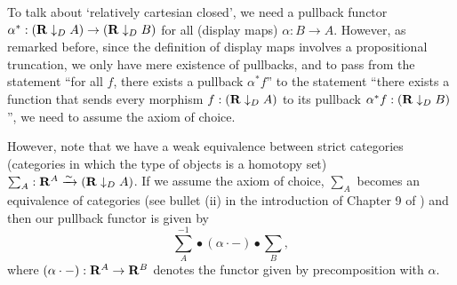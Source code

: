 \begin{remark}
  To talk about `relatively cartesian closed', we need a pullback functor $ \alpha^* : (\mathbf{R} \downarrow_D A) \to (\mathbf{R} \downarrow_D B) $ for all (display maps) $ \alpha: B \to A $. However, as remarked before, since the definition of display maps involves a propositional truncation, we only have mere existence of pullbacks, and to pass from the statement ``for all $ f $, there exists a pullback $ \alpha^* f $'' to the statement ``there exists a function that sends every morphism $ f : (\mathbf{R} \downarrow_D A) $ to its pullback $ \alpha^* f : (\mathbf{R} \downarrow_D B) $'', we need to assume the axiom of choice.

  However, note that we have a weak equivalence between strict categories (categories in which the type of objects is a homotopy set) $ \sum_A: \mathbf{R}^A \xrightarrow \sim (\mathbf{R} \downarrow_D A) $. If we assume the axiom of choice, $ \sum_A $ becomes an equivalence of categories (see bullet (ii) in the introduction of Chapter 9 of \autocite{hottbook}) and then our pullback functor is given by
  \[ \sum_A^{-1} \bullet (\alpha \cdot -) \bullet \sum_B, \]
  where $ (\alpha \cdot -): \mathbf{R}^A \to \mathbf{R}^B $ denotes the functor given by precomposition with $ \alpha $.
\end{remark}

